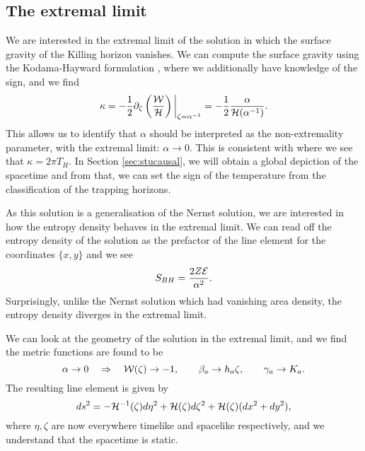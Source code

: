 \subsection{The extremal limit}
\label{sec:4Dext}

We are interested in the extremal limit of the solution in which the surface gravity of the Killing horizon vanishes. We can compute the surface gravity using the Kodama-Hayward formulation , where we additionally have knowledge of the sign, and we find
\begin{equation*}
	\kappa = - \frac{1}{2} \partial_\zeta \left( \frac{{\cal W}}{{\cal H}} \right) \bigg|_{\zeta = \alpha^{-1}} = - \frac{1}{2} \frac{\alpha}{{\cal H}(\alpha^{-1})}.
\end{equation*}
This allows us to identify that $\alpha$ should be interpreted as the non-extremality parameter, with the extremal limit: $\alpha \rightarrow 0$. This is consistent with  where we see that $\kappa = 2\pi T_H$. In Section \ref{sec:stucausal}, we will obtain a global depiction of the spacetime and from that, we can set the sign of the temperature from the classification of the trapping horizons.

As this solution is a generalisation of the Nernst solution, we are interested in how the entropy density behaves in the extremal limit. We can read off the entropy density of the solution as the prefactor of the line element for the coordinates $\{x,y\}$ and we see
\begin{equation*}
    S_{BH} = \frac{2 Z {\cal E}}{\alpha^2} .
\end{equation*}
Surprisingly, unlike the Nernst solution which had vanishing area density, the entropy density diverges in the extremal limit. 

We can look at the geometry of the solution in the extremal limit, and we find the metric functions are found to be
\begin{equation}
\label{eq:extlim}
    \alpha \rightarrow 0 \quad \Rightarrow \quad {\cal W}(\zeta) \rightarrow -1, \qquad \beta_a \rightarrow h_a \zeta, \qquad     \gamma_a \rightarrow K_a .
\end{equation}
The resulting line element is given by
\begin{equation}
\label{eq:stuextremal}
ds^2 =  - {\cal H}^{-1}(\zeta) d\eta^2 + {\cal H}(\zeta) d\zeta^2  + {\cal H}(\zeta) (dx^2 + dy^2),
\end{equation}
where $\eta, \zeta$ are now everywhere timelike and spacelike respectively, and we understand that the spacetime is static. 

